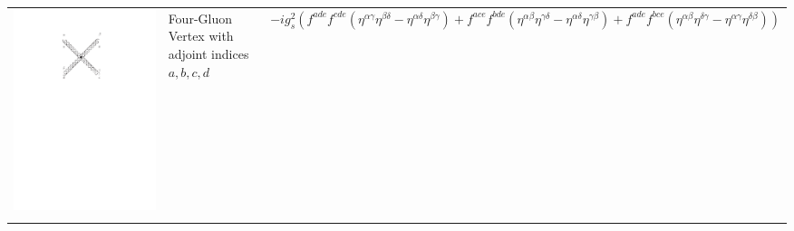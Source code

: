 \begin{table}[h!]
\begin{tabular}{ | c | m{5cm} | m{5cm} | }
\begin{minipage}{.3\textwidth}
      \includegraphics[scale=0.7]{Images/4g_vert.pdf}
    \end{minipage}
    &
    Four-Gluon Vertex with adjoint indices $a,b,c,d$
    & 
    \begin{minipage}{5cm}
    \centering
     $  -ig_s^2 (f^{ade}f^{cde}(\eta^{\alpha \gamma} \eta^{\beta \delta} - \eta^{\alpha \delta} \eta^{\beta \gamma}) + f^{ace}f^{bde}(\eta^{\alpha \beta} \eta^{\gamma \delta} - \eta^{\alpha \delta} \eta^{\gamma \beta}) + f^{ade}f^{bce}(\eta^{\alpha \beta} \eta^{ \delta \gamma } - \eta^{\alpha \gamma} \eta^{\delta \beta}))$
    \end{minipage}
    \\ [\VSpace]
            	\begin{minipage}{.3\textwidth}

\end{minipage}
\end{tabular}
\end{table}
